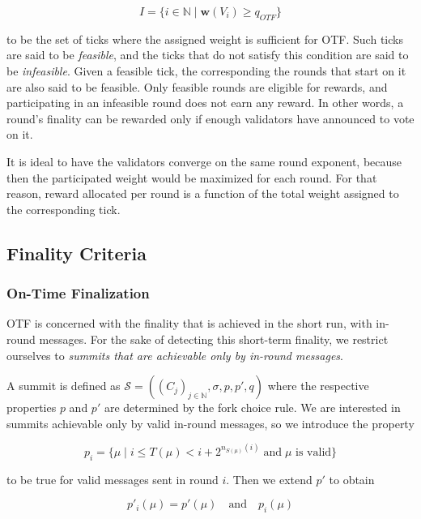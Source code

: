 \begin{equation}
I = \{i\in \mathbb{N} \mid \boldsymbol{w}(V_i)\geq q_{OTF}\}
\end{equation}

to be the set of ticks where the assigned weight is sufficient for OTF. Such ticks are said to be \emph{feasible}, and the ticks that do not satisfy this condition are said to be \emph{infeasible}. Given a feasible tick, the corresponding the rounds that start on it are also said to be feasible. Only feasible rounds are eligible for rewards, and participating in an infeasible round does not earn any reward. In other words, a round's finality can be rewarded only if enough validators have announced to vote on it.

It is ideal to have the validators converge on the same round exponent, because then the participated weight would be maximized for each round. For that reason, reward allocated per round is a function of the total weight assigned to the corresponding tick.

\subsection{Finality Criteria}
\label{sec:finality-criteria}

\subsubsection*{On-Time Finalization}
\label{sec:on-time-finalization}

OTF is concerned with the finality that is achieved in the short run, with in-round messages. For the sake of detecting this short-term finality, we restrict ourselves to \emph{summits that are achievable only by in-round messages}.

A summit is defined as $\mathcal{S}=((C_j)_{j\in\mathbb{N}}, \sigma,p,p',q)$ where the respective properties $p$ and $p'$ are determined by the fork choice rule. We are interested in summits achievable only by valid in-round messages, so we introduce the property

\begin{equation}
  p_i = \{\mu \mid i \leq T(\mu)< i+2^{n_{S(\mu) }(i)}\;\text{and}\;\mu\text{ is valid}\}
\end{equation}

to be true for valid messages sent in round $i$. Then we extend $p'$ to obtain

\begin{equation}
  p'_{i}(\mu) = p'(\mu)\quad\text{and}\quad p_{i}(\mu)
\end{equation}

